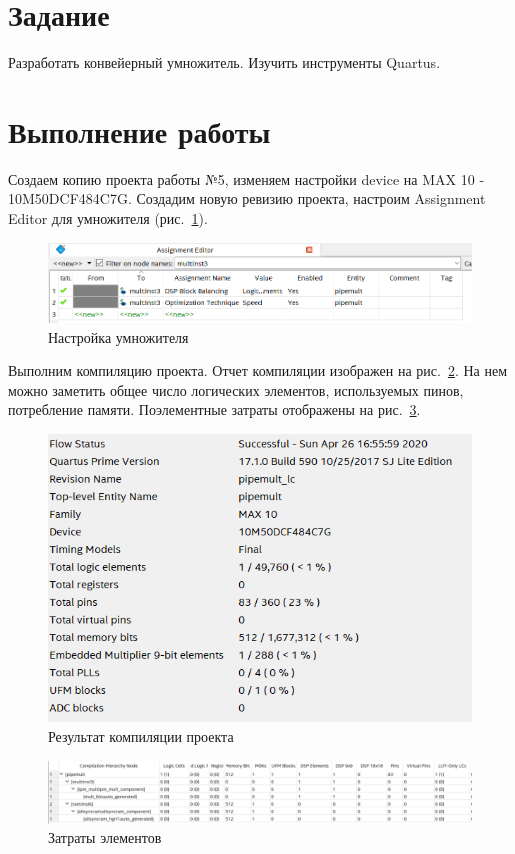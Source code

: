 \documentclass[a4paper,14pt]{article}
\begin{document}

\tableofcontents
\pagebreak

\section{Задание}

Разработать конвейерный умножитель.
Изучить инструменты Quartus.

\section{Выполнение работы}

Создаем копию проекта работы №5, изменяем настройки device на MAX 10 - 10M50DCF484C7G.
Создадим новую ревизию проекта, настроим Assignment Editor для умножителя (рис.~\ref{fig:setup}).

\begin{figure}[H]
	\centering
	\includegraphics[width=\linewidth]{image/setup}
	\caption{Настройка умножителя}
	\label{fig:setup}
\end{figure}

Выполним компиляцию проекта.
Отчет компиляции изображен на рис.~\ref{fig:compile}.
На нем можно заметить общее число логических элементов, используемых пинов, потребление памяти.
Поэлементные затраты отображены на рис.~\ref{fig:elements}.

\begin{figure}[H]
	\centering
	\includegraphics[width=0.6\linewidth]{image/compile}
	\caption{Результат компиляции проекта}
	\label{fig:compile}
\end{figure}

\begin{figure}[H]
	\centering
	\includegraphics[width=\linewidth]{image/elements}
	\caption{Затраты элементов}
	\label{fig:elements}
\end{figure}
\end{document}
